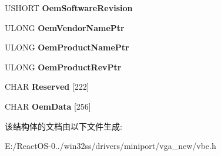 \begin{DoxyCompactItemize}
U\+S\+H\+O\+RT {\bfseries Oem\+Software\+Revision}
\item 
\mbox{\label{struct___v_b_e___c_o_n_t_r_o_l_l_e_r___i_n_f_o_adc9089969694e5d01baf900df912b24d}} 
U\+L\+O\+NG {\bfseries Oem\+Vendor\+Name\+Ptr}
\item 
\mbox{\label{struct___v_b_e___c_o_n_t_r_o_l_l_e_r___i_n_f_o_aba7442f2583c1af6f2c5d789c3b4fb23}} 
U\+L\+O\+NG {\bfseries Oem\+Product\+Name\+Ptr}
\item 
\mbox{\label{struct___v_b_e___c_o_n_t_r_o_l_l_e_r___i_n_f_o_ad849574cd388042d328252168c3e5411}} 
U\+L\+O\+NG {\bfseries Oem\+Product\+Rev\+Ptr}
\item 
\mbox{\label{struct___v_b_e___c_o_n_t_r_o_l_l_e_r___i_n_f_o_acf1d1efcdfffe59e13898483c30a2c5c}} 
C\+H\+AR {\bfseries Reserved} \mbox{[}222\mbox{]}
\item 
\mbox{\label{struct___v_b_e___c_o_n_t_r_o_l_l_e_r___i_n_f_o_acec8e717a7de2037032a10cb532db38d}} 
C\+H\+AR {\bfseries Oem\+Data} \mbox{[}256\mbox{]}
\end{DoxyCompactItemize}


该结构体的文档由以下文件生成\+:\begin{DoxyCompactItemize}
\item 
E\+:/\+React\+O\+S-\/0../win32ss/drivers/miniport/vga\+\_\+new/vbe.\+h\end{DoxyCompactItemize}
